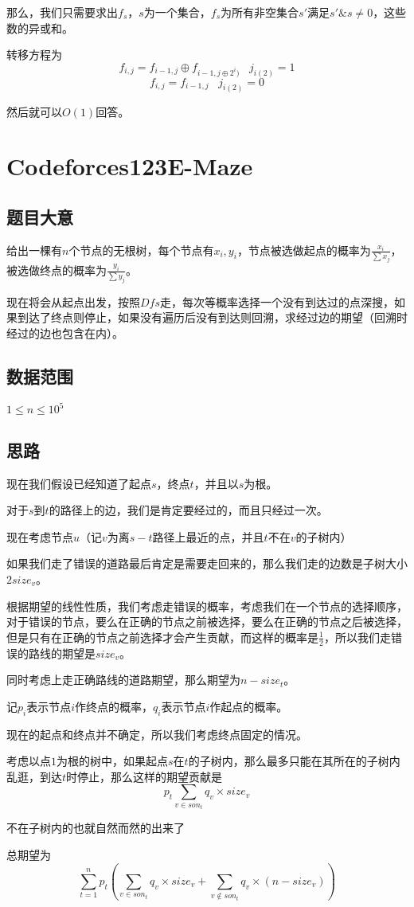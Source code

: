 \documentclass{ctexart}
\numberwithin{equation}{section}
\begin{document}
\begin{flushleft}
  那么，我们只需要求出$f_s$，$s$为一个集合，$f_s$为所有非空集合$s'$满足$s'\& s \not = 0$，这些数的异或和。

  转移方程为$$f_{i,j}=f_{i-1,j} \oplus f_{i-1,j\oplus 2^i)} \;\;\; j_{i(2)}=1$$
  $$f_{i,j}=f_{i-1,j} \;\;\; j_{i(2)}=0$$

  然后就可以$O(1)$回答。

  \newpage

  \section{Codeforces123E-Maze}
  \subsection{题目大意}
  给出一棵有$n$个节点的无根树，每个节点有$x_i,y_i$，节点被选做起点的概率为$\frac{x_i}{\sum x_j}$，被选做终点的概率为$\frac{y_i}{\sum y_j}$。

  现在将会从起点出发，按照$Dfs$走，每次等概率选择一个没有到达过的点深搜，如果到达了终点则停止，如果没有遍历后没有到达则回溯，求经过边的期望（回溯时经过的边也包含在内）。

  

  \subsection{数据范围}
  $1\le n\le 10^5$
  \subsection{思路}
  现在我们假设已经知道了起点$s$，终点$t$，并且以$s$为根。

  对于$s$到$t$的路径上的边，我们是肯定要经过的，而且只经过一次。

  现在考虑节点$u$（记$v$为离$s-t$路径上最近的点，并且$t$不在$v$的子树内）

  如果我们走了错误的道路最后肯定是需要走回来的，那么我们走的边数是子树大小$2size_v$。

  根据期望的线性性质，我们考虑走错误的概率，考虑我们在一个节点的选择顺序，对于错误的节点，要么在正确的节点之前被选择，要么在正确的节点之后被选择，但是只有在正确的节点之前选择才会产生贡献，而这样的概率是$\frac{1}{2}$，所以我们走错误的路线的期望是$size_v$。

  同时考虑上走正确路线的道路期望，那么期望为$n-size_t$。

  记$p_i$表示节点$i$作终点的概率，$q_i$表示节点$i$作起点的概率。

  现在的起点和终点并不确定，所以我们考虑终点固定的情况。

  考虑以点$1$为根的树中，如果起点$s$在$t$的子树内，那么最多只能在其所在的子树内乱逛，到达$t$时停止，那么这样的期望贡献是$$p_t \sum_{v\in son_t}q_v\times size_v$$

  不在子树内的也就自然而然的出来了

  总期望为$$\sum_{t=1}^np_t\left(\sum_{v\in son_t}q_v\times size_v+\sum_{v\not \in son_t}q_v\times (n-size_v)\right)$$

  \newpage
  
\end{flushleft}
\end{document}
